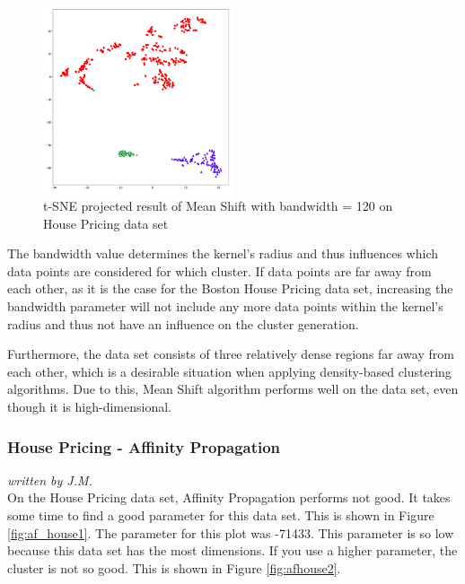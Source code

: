 \begin{figure}[H]
\begin{center}
\includegraphics[width=0.5\textwidth]{images/Meanshift_Housing_120.png}
\end{center}
\caption{t-SNE projected result of Mean Shift with bandwidth = 120 on House Pricing data set}
\label{fig:meanshift_housing_120}
\end{figure}

The bandwidth value determines the kernel's radius and thus influences which data points are considered for which cluster. If data points are far away from each other, as it is the case for the Boston House Pricing data set, increasing the bandwidth parameter will not include any more data points within the kernel's radius and thus not have an influence on the cluster generation. 

Furthermore, the data set consists of three relatively dense regions far away from each other, which is a desirable situation when applying density-based clustering algorithms. Due to this, Mean Shift algorithm performs well on the data set, even though it is high-dimensional.

\subsubsection{House Pricing - Affinity Propagation}
\textit{written by J.M.}\\

On the House Pricing data set, Affinity Propagation performs not good. It takes some time to find a good parameter for this data set. This is shown in Figure \ref{fig:af_house1}. The parameter for this plot was -71433. This parameter is so low because this data set has the most dimensions. If you use a higher parameter, the cluster is not so good. This is shown in Figure \ref{fig:afhouse2}.   


